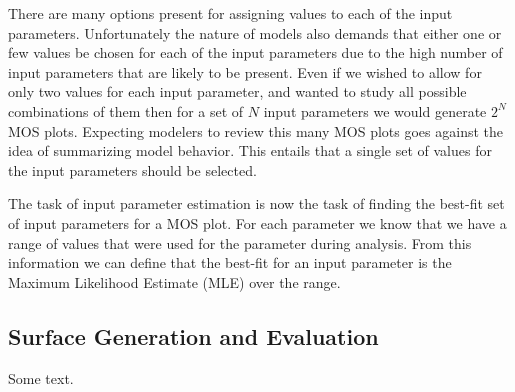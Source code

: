 There are many options present for assigning values to each of the input parameters. Unfortunately the nature of models also demands that either one or few values be chosen for each of the input parameters due to the high number of input parameters that are likely to be present. Even if we wished to allow for only two values for each input parameter, and wanted to study all possible combinations of them then for a set of $N$ input parameters we would generate $2^N$ MOS plots. Expecting modelers to review this many MOS plots goes against the idea of summarizing model behavior. This entails that a single set of values for the input parameters should be selected.

The task of input parameter estimation is now the task of finding the best-fit set of input parameters for a MOS plot. For each parameter we know that we have a range of values that were used for the parameter during analysis. From this information we can define that the best-fit for an input parameter is the Maximum Likelihood Estimate (MLE) over the range.

\subsection{Surface Generation and Evaluation\label{sec:surf_usage}}
Some text.
